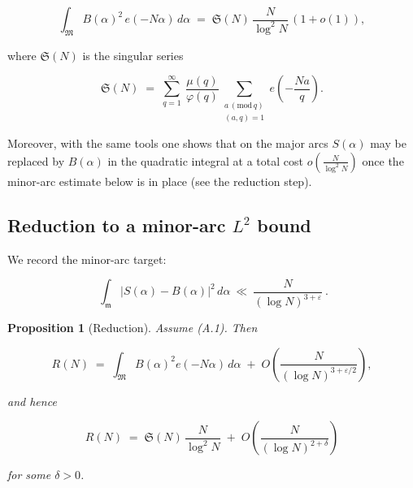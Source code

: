 \documentclass[11pt]{article}
\newtheorem{proposition}[lemma]{Proposition}
\theoremstyle{definition}
\theoremstyle{remark}
\begin{document}
$$
	\int_{\mathfrak M} B(\alpha)^2\,e(-N\alpha)\,d\alpha
	\;=\;\mathfrak S(N)\,\frac{N}{\log^2 N}\,(1+o(1)),
$$

where $\mathfrak S(N)$ is the singular series

$$
	\mathfrak S(N)\;=\;\sum_{q=1}^{\infty}\ \frac{\mu(q)}{\varphi(q)}\!
	\sum_{\substack{a\,(\mathrm{mod}\,q)\\(a,q)=1}} e\!\left(-\frac{Na}{q}\right).
$$

Moreover, with the same tools one shows that on the major arcs $S(\alpha)$ may be replaced by $B(\alpha)$ in the quadratic integral at a total cost $o\!\left(\tfrac{N}{\log^2 N}\right)$ once the minor-arc estimate below is in place (see the reduction step).


\subsection*{Reduction to a minor-arc $L^2$ bound}

We record the minor-arc target:

\begin{equation}
	\boxed{\ \ \int_{\mathfrak m}\!\bigl|S(\alpha)-B(\alpha)\bigr|^{2}\,d\alpha
		\ \ll\ \frac{N}{(\log N)^{3+\varepsilon}}\ .\ }
	\tag{A.1}
\end{equation}

\begin{proposition}[Reduction]\label{prop:reduction}
	Assume (A.1). Then

	$$
		R(N)\;=\;\int_{\mathfrak M} B(\alpha)^2 e(-N\alpha)\,d\alpha\;+\;O\!\left(\frac{N}{(\log N)^{3+\varepsilon/2}}\right),
	$$

	and hence

	$$
		R(N)\;=\;\mathfrak S(N)\,\frac{N}{\log^{2}N}\;+\;O\!\left(\frac{N}{(\log N)^{2+\delta}}\right)
	$$

	for some $\delta>0$.

\end{proposition}
\end{document}
